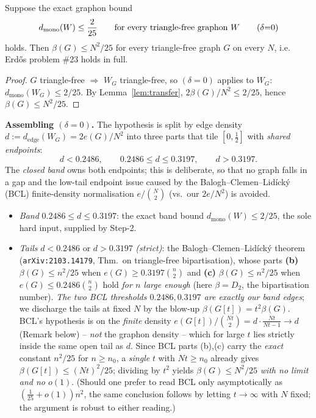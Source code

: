 \begin{theorem}\label{thm:allN}
Suppose the exact graphon bound
\[
  d_{\mathrm{mono}}(W)\le\frac{2}{25}\qquad\text{for every triangle-free graphon }W
  \tag{$\delta{=}0$}
\]
holds. Then $\beta(G)\le N^2/25$ for every triangle-free graph $G$ on every $N$, i.e.
Erd\H{o}s problem \#23 holds in full.
\end{theorem}

\begin{proof}
$G$ triangle-free $\Rightarrow$ $W_G$ triangle-free, so $(\delta{=}0)$ applies to
$W_G$: $d_{\mathrm{mono}}(W_G)\le 2/25$. By Lemma~\ref{lem:transfer},
$2\beta(G)/N^2\le 2/25$, hence $\beta(G)\le N^2/25$.
\end{proof}

\noindent\textbf{Assembling $(\delta{=}0)$.} The hypothesis is split by edge density
$d:=d_{\mathrm{edge}}(W_G)=2e(G)/N^2$ into three parts that tile $[0,\tfrac12]$ with
\emph{shared endpoints}:
\[
  d<0.2486,\qquad 0.2486\le d\le 0.3197,\qquad d>0.3197 .
\]
The \emph{closed band} owns both endpoints; this is deliberate, so that no graph falls
in a gap and the low-tail endpoint issue caused by the Balogh--Clemen--Lid\'ick\'y
(BCL) finite-density normalisation $e/\binom{N}{2}$ (vs.\ our $2e/N^2$) is avoided.
\begin{itemize}
\item \emph{Band} $0.2486\le d\le 0.3197$: the exact band bound
  $d_{\mathrm{mono}}(W)\le 2/25$, the sole hard input, supplied by Step-2.
\item \emph{Tails} $d<0.2486$ or $d>0.3197$ \emph{(strict)}: the Balogh--Clemen--Lid\'ick\'y
  theorem (\texttt{arXiv:2103.14179}, Thm.\ on triangle-free bipartisation), whose parts
  \textbf{(b)} $\beta(G)\le n^2/25$ when $e(G)\ge 0.3197\binom n2$ and \textbf{(c)}
  $\beta(G)\le n^2/25$ when $e(G)\le 0.2486\binom n2$ hold \emph{for $n$ large enough}
  (here $\beta=D_2$, the bipartisation number). \emph{The two BCL thresholds
  $0.2486,0.3197$ are exactly our band edges}; we discharge the tails at fixed $N$ by the
  blow-up $\beta(G[t])=t^2\beta(G)$. BCL's hypothesis is on the \emph{finite} density
  $e(G[t])/\binom{Nt}{2}=d\cdot\frac{Nt}{Nt-1}\to d$ (Remark below) -- \emph{not} the
  graphon density -- which for large $t$ lies strictly inside the same open tail as $d$.
  Since BCL parts (b),(c) carry the \emph{exact} constant $n^2/25$ for $n\ge n_0$, a
  \emph{single} $t$ with $Nt\ge n_0$ already gives $\beta(G[t])\le (Nt)^2/25$; dividing
  by $t^2$ yields $\beta(G)\le N^2/25$ \emph{with no limit and no $o(1)$}. (Should one
  prefer to read BCL only asymptotically as $(\tfrac1{25}+o(1))n^2$, the same conclusion
  follows by letting $t\to\infty$ with $N$ fixed; the argument is robust to either reading.)
\end{itemize}

